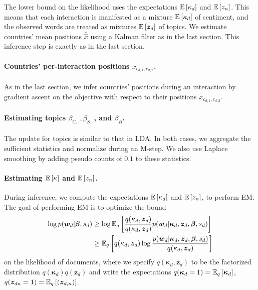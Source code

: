 The lower bound on the likelihood uses the expectations
$\mathbb{E}\left[\kappa_d\right]$ and $\mathbb{E}\left[z_n\right]$.  This means that each
interaction is manifested as a mixture $\mathbb{E}\left[\kappa_d\right]$ of
sentiment, and the observed words are treated as mixtures $\mathbb{E}\left[\bm
  z_d\right]$ of topics.  We estimate countries' mean positions $\bar \hat
x$ using a Kalman filter \citep{kalman:1960} as in the last section.
This inference step is exactly as in the last section.


\paragraph{Countries' per-interaction positions $x_{c_{d,1}, c_{d,2}}$.}
As in the last section, we infer countries' positions during an
interaction by gradient ascent on the objective with respect to their
positions $x_{c_{d,1}, c_{d,2}}$.

\paragraph{Estimating topics $\beta_{C, \cdot}, \beta_{S, \cdot}$, and $\beta_{B}$.}
The update for topics is similar to that in LDA.  In both cases, we
aggregate the sufficient statistics and normalize during an M-step.
We also use Laplace smoothing by adding pseudo counts of
$0.1$ to these statistics.

\paragraph{Estimating $\mathbb{E}\left[\kappa\right]$ and $\mathbb{E}\left[z_n\right]$.}
During inference, we compute the expectations $\mathbb{E}\left[\kappa_d\right]$ and
$\mathbb{E}\left[z_n\right]$, to perform EM.  The goal of performing EM is to optimize the bound
\begin{align}
  \log p(\bm w_d | \bm \beta, s_d)
  & \ge \log \mathbb{E}_q\left[ \frac{q(\kappa_d, \bm z_d)}{q(\kappa_d, \bm z_d)} p(\bm w_d | \bm \kappa_d, \bm z_d, \bm \beta, s_d) \right] \\
  & \ge \mathbb{E}_q\left[ q(\kappa_d, \bm z_d) \log \frac{p(\bm w_d | \bm \kappa_d, \bm z_d, \bm \beta, s_d)}{q(\kappa_d, \bm z_d)} \right]
\end{align}
on the likelihood of documents, where we specify $q(\bm \kappa_d, \bm
z_d)$ to be the factorized distribution $q(\bm \kappa_d) q(\bm z_d)$
and write the expectations $q(\bm \kappa_{d} = 1) = \mathbb{E}_q\left[\bm
  \kappa_d\right]$, $q(\bm z_{dn}=1) = \mathbb{E}_q\left[(\bm z_{d,n})\right]$.

